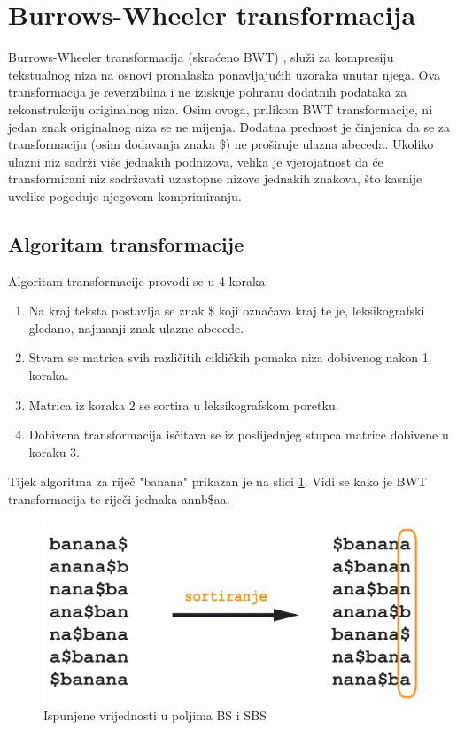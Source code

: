 \section{Burrows-Wheeler transformacija}
Burrows-Wheeler transformacija (skraćeno BWT) \cite{bwt1}, služi za kompresiju tekstualnog niza na osnovi pronalaska ponavljajućih uzoraka unutar njega. Ova transformacija je reverzibilna i ne iziskuje pohranu dodatnih podataka za rekonstrukciju originalnog niza. Osim ovoga, prilikom BWT transformacije, ni jedan znak originalnog niza se ne mijenja. Dodatna prednost je činjenica da se za transformaciju (osim dodavanja znaka \$) ne proširuje ulazna abeceda. Ukoliko ulazni niz sadrži više jednakih podnizova, velika je vjerojatnost da će transformirani niz sadržavati uzastopne nizove jednakih znakova, što kasnije uvelike pogoduje njegovom komprimiranju.

\subsection{Algoritam transformacije}
Algoritam transformacije provodi se u 4 koraka:

\begin{enumerate}
  \item Na kraj teksta postavlja se znak \$ koji označava kraj te je, leksikografski gledano, najmanji znak ulazne 			abecede.
  \item Stvara se matrica svih različitih cikličkih pomaka niza dobivenog nakon 1. koraka.
  \item Matrica iz koraka 2 se sortira u leksikografskom poretku.
  \item Dobivena transformacija isčitava se iz poslijednjeg stupca matrice dobivene u koraku 3.

\end{enumerate}

Tijek algoritma za riječ "banana" prikazan je na slici \ref{bwt1}. Vidi se kako je BWT transformacija te riječi jednaka annb\$aa. 


\begin{figure}[H]
\centering
\includegraphics[scale=0.2]{./pictures/bwt.jpg}
\caption{Ispunjene vrijednosti u poljima BS i SBS}\label{bwt1}
\end{figure}

